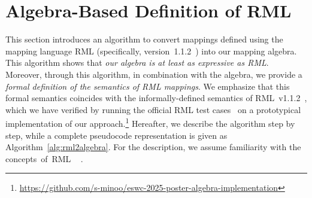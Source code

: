 \vspace{-4mm} %
\enlargethispage{\baselineskip}%

\section{Algebra-Based Definition of RML}%
\label{sec:expressiveness}

\vspace{-2mm} %

This section
	introduces
an algorithm to convert mappings defined using the mapping language RML (specifically, version~1.1.2~\cite{Dimou2024:RMLSpec}) into our
	mapping
algebra.
	This algorithm shows
that \emph{our algebra is at least as expressive as RML}. Moreover, through this algorithm, in combination with the algebra, we provide
	a \emph{%
formal definition of the semantics of RML mappings}.
We emphasize that this formal semantics coincides with the informally-defined semantics of RML~v1.1.2~\cite{Dimou2024:RMLSpec}, which we have verified by running the official RML test cases~\cite{Heyvaert2019:RMLTests} on a prototypical implementation of our approach.\footnote{\url{https://github.com/s-minoo/eswc-2025-poster-algebra-implementation}}
Hereafter, we describe the algorithm step by step, while a complete pseudocode representation is given as Algorithm~\ref{alg:rml2algebra}.
For the description, we assume
	familiarity
with the concepts~of~RML%
	~\cite{dimou_ldow_2014,Dimou2024:RMLSpec,IglesiasMolina2023:RMLOntology}%
.

\begin{algorithm}[t!]

\end{algorithm}


